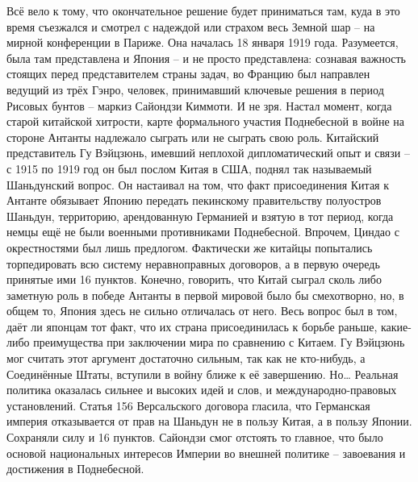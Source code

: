 Всё вело к тому, что окончательное решение будет приниматься там, куда в это время съезжался и смотрел с надеждой или страхом весь Земной шар – на мирной конференции в Париже. Она началась 18 января 1919 года. Разумеется, была там представлена и Япония – и не просто представлена: сознавая важность стоящих перед представителем страны задач, во Францию был направлен ведущий из трёх Гэнро, человек, принимавший ключевые решения в период Рисовых бунтов – маркиз Сайондзи Киммоти. И не зря. Настал момент, когда старой китайской хитрости, карте формального участия Поднебесной в войне на стороне Антанты надлежало сыграть или не сыграть свою роль. Китайский представитель Гу Вэйцзюнь, имевший неплохой дипломатический опыт и связи – с 1915 по 1919 год он был послом Китая в США, поднял так называемый Шаньдунский вопрос. Он настаивал на том, что факт присоединения Китая к Антанте обязывает Японию передать пекинскому правительству полуостров Шаньдун, территорию, арендованную Германией и взятую в тот период, когда немцы ещё не были военными противниками Поднебесной. Впрочем, Циндао с окрестностями был лишь предлогом. Фактически же китайцы попытались торпедировать всю систему неравноправных договоров, а в первую очередь принятые ими 16 пунктов. Конечно, говорить, что Китай сыграл сколь либо заметную роль в победе Антанты в первой мировой было бы смехотворно, но, в общем то, Япония здесь не сильно отличалась от него. Весь вопрос был в том, даёт ли японцам тот факт, что их страна присоединилась к борьбе раньше, какие-либо преимущества при заключении мира по сравнению с Китаем. Гу Вэйцзюнь мог считать этот аргумент достаточно сильным, так как не кто-нибудь, а Соединённые Штаты, вступили в войну ближе к её завершению. Но… Реальная политика оказалась сильнее и высоких идей и слов, и международно-правовых установлений. Статья 156 Версальского договора гласила, что Германская империя отказывается от прав на Шаньдун не в пользу Китая, а в пользу Японии. Сохраняли силу и 16 пунктов. Сайондзи смог отстоять то главное, что было основой национальных интересов Империи во внешней политике – завоевания и достижения в Поднебесной. 

